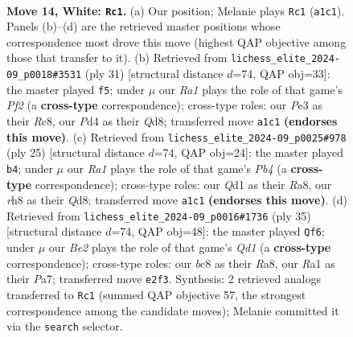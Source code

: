 \documentclass[11pt]{article}
\begin{document}
\clearpage

\begin{figure}[p]\centering
\begin{subfigure}{0.46\textwidth}\centering
\resizebox{\linewidth}{!}{%
\newchessgame
\chessboard[
  setfen={1rb1k2r/ppqn2pp/2p5/3p2p1/3P4/2N1P3/PP2BPPP/R2Q1RK1 w k - 2 14},
  showmover=false,
  pgfstyle=straightmove, color=movearrow, markmove={a1-c1}
]}
\caption{}
\end{subfigure}\hfill
\begin{subfigure}{0.46\textwidth}\centering
\resizebox{\linewidth}{!}{%
\newchessgame
\chessboard[
  setfen={2rq1rk1/3nbpp1/p2p3p/1p1Pp3/8/2P1BN1P/PP3PP1/R2QR1K1 b - - 0 16},
  showmover=false,
  pgfstyle=straightmove, color=movearrow, markmove={f7-f5}
]}
\caption{}
\end{subfigure}
\\[4pt]
\begin{subfigure}{0.46\textwidth}\centering
\resizebox{\linewidth}{!}{%
\newchessgame
\chessboard[
  setfen={r2q1rk1/pb1p2pp/2n1pb2/1pp5/8/2PP1NP1/PP3PBP/R1BQR1K1 b - - 0 13},
  showmover=false,
  pgfstyle=straightmove, color=movearrow, markmove={b5-b4}
]}
\caption{}
\end{subfigure}\hfill
\begin{subfigure}{0.46\textwidth}\centering
\resizebox{\linewidth}{!}{%
\newchessgame
\chessboard[
  setfen={r2q1rk1/pp3ppp/3p2n1/2pP3n/2P1PP2/3BQ3/PP5P/R3NRK1 b - - 0 18},
  showmover=false,
  pgfstyle=straightmove, color=movearrow, markmove={d8-f6}
]}
\caption{}
\end{subfigure}
\caption{\textbf{Move 14, White: \texttt{Rc1}.} (a) Our position; Melanie plays \texttt{Rc1} (\texttt{a1c1}). Panels (b)--(d) are the retrieved master positions whose correspondence most drove this move (highest QAP objective among those that transfer to it). (b) Retrieved from \texttt{lichess\_elite\_2024-09\_p0018\#3531} (ply 31) [structural distance $d$=74, QAP obj=33]: the master played \texttt{f5}; under $\mu$ our \emph{Ra1} plays the role of that game's \emph{Pf2} (a \textbf{cross-type} correspondence); cross-type roles: our \emph{P}e3 as their \emph{R}c8, our \emph{P}d4 as their \emph{Q}d8; transferred move \texttt{a1c1} \textbf{(endorses this move)}. (c) Retrieved from \texttt{lichess\_elite\_2024-09\_p0025\#978} (ply 25) [structural distance $d$=74, QAP obj=24]: the master played \texttt{b4}; under $\mu$ our \emph{Ra1} plays the role of that game's \emph{Pb4} (a \textbf{cross-type} correspondence); cross-type roles: our \emph{Q}d1 as their \emph{R}a8, our \emph{r}h8 as their \emph{Q}d8; transferred move \texttt{a1c1} \textbf{(endorses this move)}. (d) Retrieved from \texttt{lichess\_elite\_2024-09\_p0016\#1736} (ply 35) [structural distance $d$=74, QAP obj=48]: the master played \texttt{Qf6}; under $\mu$ our \emph{Be2} plays the role of that game's \emph{Qd1} (a \textbf{cross-type} correspondence); cross-type roles: our \emph{b}c8 as their \emph{R}a8, our \emph{R}a1 as their \emph{P}a7; transferred move \texttt{e2f3}. Synthesis: 2 retrieved analogs transferred to \texttt{Rc1} (summed QAP objective 57, the strongest correspondence among the candidate moves); Melanie committed it via the \texttt{search} selector.}
\label{fig:thought-m26}
\end{figure}
\end{document}
